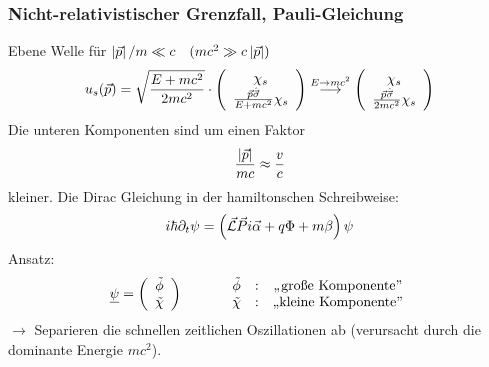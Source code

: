 \subsubsection{Nicht-relativistischer Grenzfall, Pauli-Gleichung}
Ebene Welle für $\left|\vec p\right|/m \ll c\quad (mc^2\gg c \left|\vec p\right|)$
\begin{eqnarray*}
u_s(\vec p) = \sqrt{\frac{E+m c^2}{2mc^2}} \cdot \left ( \begin{array} c \chi_s \\ \frac{\vec p \hat {\vec \sigma}}{E + m c^2}\chi_s\end{array}\ri)\overset{E\rightarrow m c^2}{\longrightarrow} \left ( \begin{array}{c}\chi_s \\ \frac{\vec p\hat{\vec\sigma}}{2 m c^2}\chi_s\end{array}\ri)
\end{eqnarray*}
Die unteren Komponenten sind um einen Faktor
\begin{eqnarray*}
\frac{\left|\vec p\right|}{m c} \approx \frac v c 
\end{eqnarray*}
kleiner.
Die Dirac Gleichung in der hamiltonschen Schreibweise:
\begin{eqnarray*}
i\hbar \partial _ t\psi = \left(\vec {\mathcal L} \vec Pi \vec \alpha + q \Phi + m \beta\right ) \psi
\end{eqnarray*}
Ansatz:
\begin{eqnarray*}
\underline \psi = \left (\begin{array} {c} \tilde{\phi}\\ \tilde \chi\end{array}\right) \qquad \quad \begin{array}{ccc} \tilde \phi & : &\text{,,große Komponente''}\\\tilde \chi & : &\text{,,kleine Komponente''}\end{array}
\end{eqnarray*}
$\rightarrow$ Separieren die schnellen zeitlichen Oszillationen ab (verursacht durch die dominante Energie $mc^2$).

